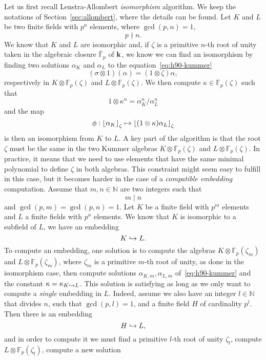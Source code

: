 Let us first recall Lenstra-Allombert \emph{isomorphism} algorithm. We keep the
notations of Section~\ref{sec:allombert}, where the details can be found. Let $K$ and
$L$ be two finite fields with $p^n$ elements, where $\gcd(p, n) = 1$, \ie
\[
  p\nmid n.
\]
We know that $K$ and $L$ are isomorphic and, if $\zeta$ is a primitive $n$-th
root of unity taken in the algebraic closure $\bar{\mathbb{F}}_p$ of $\mathbf{k}$, we know
%
we can find an isomorphism by
finding two solutions $\alpha_K$ and $\alpha_L$ to the equation~\eqref{eq:h90-kummer}
\[
  (\sigma\otimes1)(\alpha) = (1\otimes\zeta)\alpha,
\]
respectively in $K\otimes\mathbb{F}_p(\zeta)$ and $L\otimes\mathbb{F}_p(\zeta)$.
We then compute $\kappa\in\mathbb{F}_p(\zeta)$ such that
\[
  1\otimes\kappa^n = \alpha_K^n/\alpha_L^n
\]
and the map
\[
  \phi:\left\lfloor \alpha_K \right\rfloor_{\zeta}\mapsto\left\lfloor (1\otimes\kappa)\alpha_L \right\rfloor_{\zeta}
\]
is then an isomorphism from $K$ to $L$. A key part of the algorithm is that the
root $\zeta$ must be the same in the two Kummer algebras
$K\otimes\mathbb{F}_p(\zeta)$ and $L\otimes\mathbb{F}_p(\zeta)$. In practice, it
means that we need to use elements that have the same minimal polynomial to
define $\zeta$ in both algebras. This constraint might seem easy to fulfill in
this case, but it becomes harder in the case of a \emph{compatible embedding}
computation. Assume that $m, n\in\mathbb{N}$ are two integers such that
\[
  m\mid n
\]
and $\gcd(p, m)=\gcd(p, n)=1$. Let $K$ be a finite field with $p^m$ elements and
$L$ a finite fields with $p^n$ elements. We know that $K$ is isomorphic to a
subfield of $L$, \ie we have an embedding
\[
  K\hookrightarrow L.
\]
To compute an embedding, one solution is to compute the algebras
$K\otimes\mathbb{F}_p(\zeta_m)$ and
$L\otimes\mathbb{F}_p(\zeta_m)$, where $\zeta_m$ is a primitive $m$-th root of
unity, as done in the isomorphism case, then compute solutions
$\alpha_{K, m}, \alpha_{L, m}$ of~\eqref{eq:h90-kummer} and the constant
$\kappa=\kappa_{K\hookrightarrow L}$. This solution is satisfying as long as we only want
to compute a \emph{single} embedding in $L$. Indeed, assume we also have an
integer $l\in\mathbb{N}$ that divides $n$, such that $\gcd(p, l)=1$, and a
finite field $H$ of cardinality $p^l$. Then there is an embedding
\[
  H\hookrightarrow L,
\]
and in order to compute it we must find a primitive $l$-th root of unity
$\zeta_l$, compute $L\otimes\mathbb{F}_p(\zeta_l)$, compute a new solution
